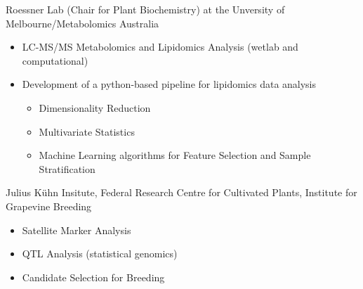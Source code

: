 {%
	}
{%
	Roessner Lab (Chair for Plant Biochemistry) at the Unversity of Melbourne/Metabolomics Australia
}
{%
	\vspace*{.07cm}
	\begin{itemize}
		\item LC-MS/MS Metabolomics and Lipidomics Analysis (wetlab and computational)
		\item Development of a python-based pipeline for lipidomics data analysis
		\begin{itemize}
			\item Dimensionality Reduction
			\item Multivariate Statistics
			\item Machine Learning algorithms for Feature Selection and Sample Stratification
		\end{itemize}
	\end{itemize}
}

{%
}
{%
	Julius K\"uhn Insitute, Federal Research Centre for Cultivated Plants, Institute for Grapevine Breeding
}
{%
	\vspace*{.07cm}
	\begin{itemize}
		\item Satellite Marker Analysis
		\item QTL Analysis (statistical genomics)
		\item Candidate Selection for Breeding
	\end{itemize}
}
